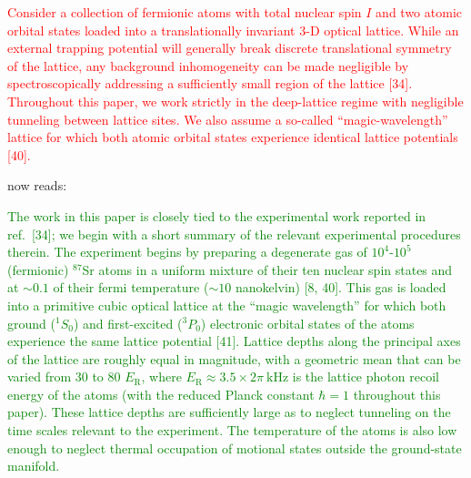 \documentclass[preprint]{revtex4-1}
\renewcommand{\t}{\text} %
\newcommand{\1}{\mathds{1}}
\newcommand{\red}[1]{\textcolor{red}{#1}}
\newcommand{\green}[1]{\textcolor{green}{#1}}
\begin{document}
\begin{enumerate}
  \red{Consider a collection of fermionic atoms with total nuclear
    spin $I$ and two atomic orbital states loaded into a
    translationally invariant 3-D optical lattice.  While an external
    trapping potential will generally break discrete translational
    symmetry of the lattice, any background inhomogeneity can be made
    negligible by spectroscopically addressing a sufficiently small
    region of the lattice [34].  Throughout this paper, we work
    strictly in the deep-lattice regime with negligible tunneling
    between lattice sites.  We also assume a so-called
    ``magic-wavelength'' lattice for which both atomic orbital states
    experience identical lattice potentials [40].}

  now reads:

  \green{The work in this paper is closely tied to the experimental
    work reported in ref.~[34]; we begin with a short summary of the
    relevant experimental procedures therein.  The experiment begins
    by preparing a degenerate gas of $10^4$-$10^5$ (fermionic)
    ${}^{87}$Sr atoms in a uniform mixture of their ten nuclear spin
    states and at $\sim0.1$ of their fermi temperature ($\sim10$
    nanokelvin) [8, 40].  This gas is loaded into a primitive cubic
    optical lattice at the ``magic wavelength'' for which both ground
    (${}^1S_0$) and first-excited (${}^3P_0$) electronic orbital
    states of the atoms experience the same lattice potential [41].
    Lattice depths along the principal axes of the lattice are roughly
    equal in magnitude, with a geometric mean that can be varied from
    30 to 80 $E_{\t{R}}$, where
    $E_{\t{R}}\approx3.5\times2\pi~\t{kHz}$ is the lattice photon
    recoil energy of the atoms (with the reduced Planck constant
    $\hbar=1$ throughout this paper).  These lattice depths are
    sufficiently large as to neglect tunneling on the time scales
    relevant to the experiment.  The temperature of the atoms is also
    low enough to neglect thermal occupation of motional states
    outside the ground-state manifold.}


\end{enumerate}
\end{document}
